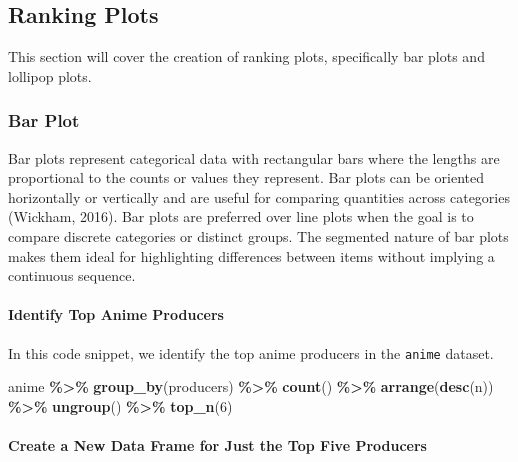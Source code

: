 \documentclass[
]{book}
\newenvironment{Shaded}{\begin{snugshade}}{\end{snugshade}}
\newcommand{\DecValTok}[1]{\textcolor[rgb]{0.00,0.00,0.81}{#1}}
\newcommand{\FunctionTok}[1]{\textcolor[rgb]{0.13,0.29,0.53}{\textbf{#1}}}
\newcommand{\NormalTok}[1]{#1}
\newcommand{\SpecialCharTok}[1]{\textcolor[rgb]{0.81,0.36,0.00}{\textbf{#1}}}
\begin{document}
\subsection*{Ranking Plots}\label{ranking-plots}

This section will cover the creation of ranking plots, specifically bar plots and lollipop plots.

\subsubsection*{Bar Plot}\label{bar-plot}

Bar plots represent categorical data with rectangular bars where the lengths are proportional to the counts or values they represent. Bar plots can be oriented horizontally or vertically and are useful for comparing quantities across categories (Wickham, 2016). Bar plots are preferred over line plots when the goal is to compare discrete categories or distinct groups. The segmented nature of bar plots makes them ideal for highlighting differences between items without implying a continuous sequence.

\paragraph*{Identify Top Anime Producers}\label{identify-top-anime-producers}

In this code snippet, we identify the top anime producers in the \texttt{anime} dataset.

\begin{Shaded}
\begin{Highlighting}[]
\NormalTok{anime }\SpecialCharTok{\%\textgreater{}\%}
  \FunctionTok{group\_by}\NormalTok{(producers) }\SpecialCharTok{\%\textgreater{}\%}
  \FunctionTok{count}\NormalTok{() }\SpecialCharTok{\%\textgreater{}\%}
  \FunctionTok{arrange}\NormalTok{(}\FunctionTok{desc}\NormalTok{(n)) }\SpecialCharTok{\%\textgreater{}\%}
  \FunctionTok{ungroup}\NormalTok{() }\SpecialCharTok{\%\textgreater{}\%}
  \FunctionTok{top\_n}\NormalTok{(}\DecValTok{6}\NormalTok{)}
\end{Highlighting}
\end{Shaded}

\paragraph*{Create a New Data Frame for Just the Top Five Producers}\label{create-a-new-data-frame-for-just-the-top-five-producers}
\end{document}
